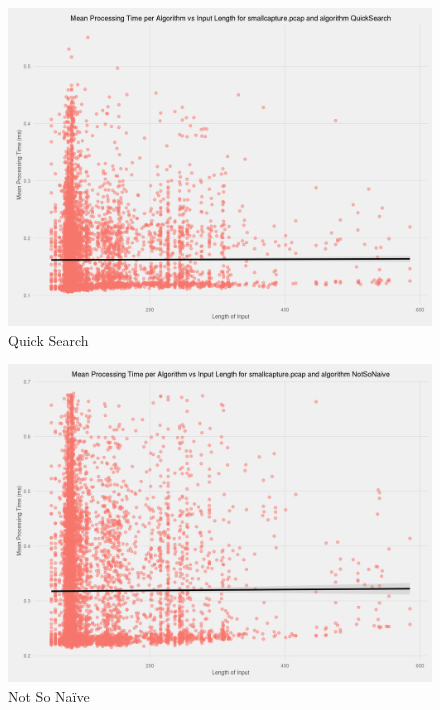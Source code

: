 \documentclass[9pt, conference]{IEEEtran}
\begin{document}
\begin{figure}[!hbt]
  \centering
  \includegraphics[width=\columnwidth]{images/scatter_mean_vs_input_length_QuickSearch}
  \caption{Quick Search}
\end{figure}

\begin{figure}[!hbt]
  \centering
  \includegraphics[width=\columnwidth]{images/scatter_mean_vs_input_length_NotSoNaive}
  \caption{Not So Na\"ive}
\end{figure}
\end{document}
